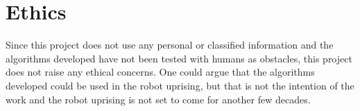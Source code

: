 


\chapter{Ethics}

\label{chapter:ethics}

Since this project does not use any personal or classified information and the
algorithms developed have not been tested with humans as obstacles, this
project does not raise any ethical concerns. One could argue that the
algorithms developed could be used in the robot uprising, but that is not the
intention of the work and the robot uprising is not set to come for another few
decades.



